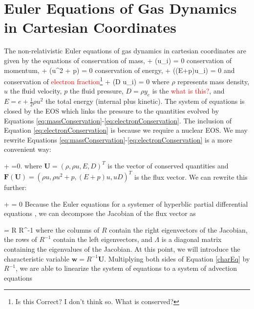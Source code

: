 \documentclass[twocolumn]{aastex62}
\begin{document}

\section{Euler Equations of Gas Dynamics in Cartesian Coordinates}
The non-relativistic Euler equations of gas dynamics
\citep[see, e.g.,][for details]{leveque:2002} in cartesian coordinates are given by
the equations of conservation of mass,
\beq
   + (\rho u_i) = 0
  \label{eq:massConservation}
\eeq
conservation of momentum,
\beq
	 + (\rho u^2 + p) = 0
  \label{eq:momentumConservation}
\eeq
conservation of energy,
\beq
   + ((E+p)u_i) = 0
  \label{eq:energyConservation}
\eeq
and conservation of \textcolor{red}{electron fraction}\footnote{Is this Correct? I don't think so. What is conserved?}
\beq
   + (D u_i) = 0
  \label{eq:electronConservation}
\eeq
where $\rho$ represents mass density, $u$ the fluid velocity, $p$ the fluid
pressure, $D=\rho y_e$ is the \textcolor{red}{what is this?},
and $E=e+\frac{1}{2}\rho u^2$ the total energy (internal plus kinetic).
The system of equations is closed by the EOS which links the pressure to
the quantities evolved by Equations
\eqref{eq:massConservation}-\eqref{eq:electronConservation}. The inclusion of
Equation \eqref{eq:electronConservation} is because we require a nuclear EOS.
We may rewrite Equations \eqref{eq:massConservation}-\eqref{eq:electronConservation}
is a more convenient way:

\beq
  +
  =0.
\eeq
where $\mathbf{U} =(\rho,\rho u,E, D)^{T}$ is the vector of conserved quantities
and $\mathbf{F}(\mathbf{U})=(\rho u,\rho u^{2}+p,(E+p)u, uD)^{T}$
is the flux vector. We can rewrite this further:

\beq
  +  
  = 0
  \label{charEq}
\eeq
Because the Euler equations for a systemer of hyperblic
partial differential equations \citep[see, e.g.,][]{leveque:1992}, we can decompose the
Jacobian of the flux vector as

\beq
   =
  R \Lambda R^{-1}
\eeq
where the columns of $R$ contain the right eigenvectors of the Jacobian,
the rows of $R^{-1}$ contain the left eigenvectors, and
$\Lambda$ is a diagonal matrix containing the eigenvalues of the Jacobian.
At this point, we will introduce the characteristic variable
$\mathbf{w} = R^{-1}\mathbf{U}$. Multiplying both sides of Equation
\eqref{charEq} by $R^{-1}$, we are able to linearize the system of equations to
a system of advection equations
\end{document}
